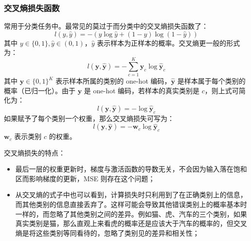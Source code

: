 \subsubsection{交叉熵损失函数}
常用于分类任务中。最常见的莫过于而分类中的交叉熵损失函数了：
$$
l(y, \hat{y}) = -(y \log \hat{y} + (1-y) \log (1-\hat{y}))
$$
其中 $y \in \{0, 1\}, \hat{y} \in (0, 1)$，$\hat y$ 表示样本为正样本的概率。交叉熵更一般的形式为：
$$
l(\boldsymbol{y}, \hat{\boldsymbol{y}}) = - \sum_{c=1}^K \boldsymbol{y}_c \log \hat{\boldsymbol{y}}_c
$$
其中 $\boldsymbol{y} \in \{0,1\}^K$ 表示样本所属的类别的 one-hot 编码，$\hat{\boldsymbol{y}}$ 是样本属于每个类别的概率（已归一化）。由于 $\boldsymbol{y}$ 是 one-hot 编码，若样本的真实类别是 $c$，则上式可简化为：
$$
l(\boldsymbol{y}, \hat{\boldsymbol{y}}) = - \log \hat{\boldsymbol{y}}_c
$$
如果赋予了每个类别一个权重，那么交叉熵损失可写为：
$$
l(\boldsymbol{y}, \hat{\boldsymbol{y}}) = - \boldsymbol{w}_c\log \hat{\boldsymbol{y}}_c
$$
$\boldsymbol{w}_c$ 表示类别 $c$ 的权重。

交叉熵损失的特点：
\begin{itemize}
	\item 最后一层的权重更新时，梯度与激活函数的导数无关，不会因为输入落在饱和区而影响梯度的更新，MSE 则存在这个问题；
	
	\item 从交叉熵的式子中也可以看到，计算损失时只利用到了在正确类别上的信息，而其他类别的信息直接丢弃了。这样可能会导致其他错误类别上的概率基本时一样的，而忽略了其他类别之间的差异。例如猫、虎、汽车的三个类别，如果真实类别是猫，那么直观上来看虎的概率还是应该大于汽车的概率的，但交叉熵是将这些类别等同看待的，忽略了类别见的差异和相关性；	
\end{itemize}

